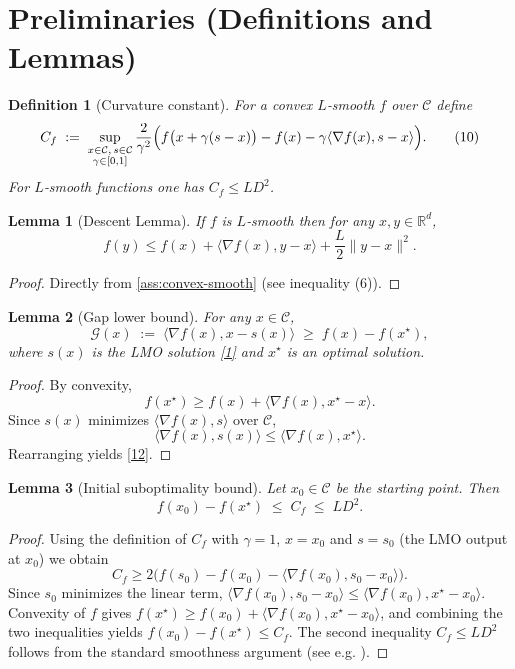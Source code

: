 \documentclass{article}
\newtheorem{lemma}{Lemma}
\newtheorem{definition}{Definition}
\newcommand{\gap}{\mathcal{G}}
\begin{document}
\newpage
\section*{Preliminaries (Definitions and Lemmas)}
\begin{definition}[Curvature constant]\label{def:curvature}
For a convex $L$‑smooth $f$ over $\mathcal{C}$ define
\[
C_f \;:=\; \sup_{\substack{x\in\mathcal{C},\, s\in\mathcal{C}\\ \gamma\in[0,1]}}
\frac{2}{\gamma^{2}}\Bigl(f\bigl(x+\gamma(s-x)\bigr)-f(x)-\gamma\langle\nabla f(x),s-x\rangle\Bigr).
\tag{10}
\]
For $L$‑smooth functions one has $C_f\le L D^{2}$.
\end{definition}
\begin{lemma}[Descent Lemma]\label{lem:descent}
If $f$ is $L$‑smooth then for any $x,y\in\mathbb{R}^{d}$,
\[
f(y)\le f(x)+\langle\nabla f(x),y-x\rangle+\frac{L}{2}\|y-x\|^{2}.
\tag{11}
\]
\end{lemma}
\begin{proof}
Directly from \eqref{ass:convex-smooth} (see inequality (6)). \qedhere
\end{proof}
\begin{lemma}[Gap lower bound]\label{lem:gap-lower}
For any $x\in\mathcal{C}$,
\[
\gap(x)\;:=\;\langle\nabla f(x),x-s(x)\rangle\;\ge\; f(x)-f(x^\star),
\tag{12}
\]
where $s(x)$ is the LMO solution \eqref{1} and $x^\star$ is an optimal solution.
\end{lemma}
\begin{proof}
By convexity,
\[
f(x^\star)\ge f(x)+\langle\nabla f(x),x^\star-x\rangle .
\]
Since $s(x)$ minimizes $\langle\nabla f(x),s\rangle$ over $\mathcal{C}$,
\[
\langle\nabla f(x),s(x)\rangle\le \langle\nabla f(x),x^\star\rangle .
\]
Rearranging yields \eqref{12}. \qedhere
\end{proof}
\begin{lemma}[Initial suboptimality bound]\label{lem:init}
Let $x_0\in\mathcal{C}$ be the starting point. Then
\[
f(x_0)-f(x^\star)\;\le\; C_f\;\le\;L D^{2}.
\tag{13}
\]
\end{lemma}
\begin{proof}
Using the definition of $C_f$ with $\gamma=1$, $x=x_0$ and $s=s_0$ (the LMO output at $x_0$) we obtain
\[
C_f\ge 2\bigl(f(s_0)-f(x_0)-\langle\nabla f(x_0),s_0-x_0\rangle\bigr).
\]
Since $s_0$ minimizes the linear term, $\langle\nabla f(x_0),s_0-x_0\rangle\le\langle\nabla f(x_0),x^\star-x_0\rangle$.
Convexity of $f$ gives $f(x^\star)\ge f(x_0)+\langle\nabla f(x_0),x^\star-x_0\rangle$, and combining the two inequalities yields
$f(x_0)-f(x^\star)\le C_f$. The second inequality $C_f\le L D^{2}$ follows from the standard smoothness argument (see e.g. \cite{Jaggi2013}). \qedhere
\end{proof}
\end{document}
